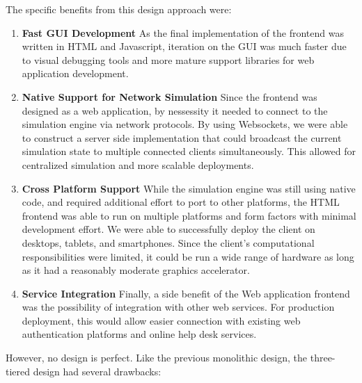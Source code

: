  The specific benefits from this design approach were:

 \begin{enumerate}
   \item \textbf{Fast GUI Development} As the final implementation of
     the frontend was written in HTML and Javascript, iteration on the
     GUI was much faster due to visual debugging tools and more mature
     support libraries for web application development.

   \item \textbf{Native Support for Network Simulation} Since the
     frontend was designed as a web application, by nessessity it
     needed to connect to the simulation engine via network
     protocols. By using Websockets, we were able to construct a
     server side implementation that could broadcast the current
     simulation state to multiple connected clients
     simultaneously. This allowed for centralized simulation and more
     scalable deployments.

   \item \textbf{Cross Platform Support} While the simulation engine
     was still using native code, and required additional effort to
     port to other platforms, the HTML frontend was able to run on
     multiple platforms and form factors with minimal development
     effort. We were able to successfully deploy the client on
     desktops, tablets, and smartphones. Since the client's
     computational responsibilities were limited, it could be run a
     wide range of hardware as long as it had a reasonably moderate
     graphics accelerator.

   \item \textbf{Service Integration} Finally, a side benefit of the
     Web application frontend was the possibility of integration with
     other web services. For production deployment, this would allow
     easier connection with existing web authentication platforms and
     online help desk services. 
     
 \end{enumerate}


 However, no design is perfect. Like the previous monolithic design,
 the three-tiered design had several drawbacks:


